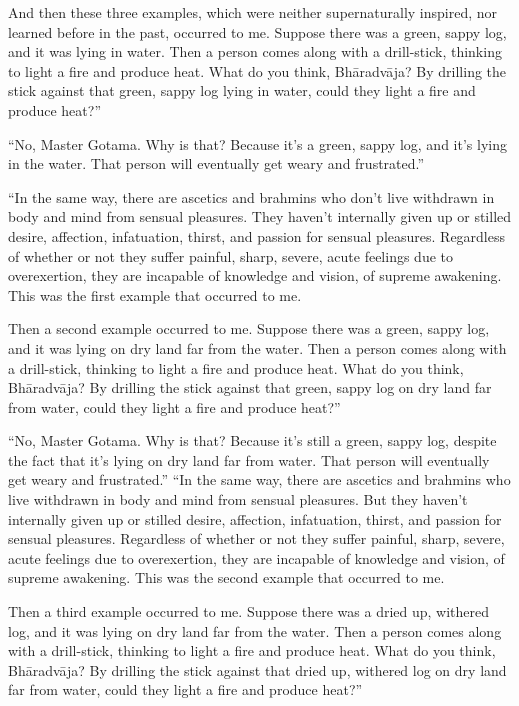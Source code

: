 \documentclass[12pt,openany]{book}%
\begin{document}
And then these three examples, which were neither supernaturally inspired, nor learned before in the past, occurred to me. Suppose there was a green, sappy log, and it was lying in water. Then a person comes along with a drill-stick, thinking to light a fire and produce heat. What do you think, \textsanskrit{Bhāradvāja}? By drilling the stick against that green, sappy log lying in water, could they light a fire and produce heat?” 

“No, Master Gotama. Why is that? Because it’s a green, sappy log, and it’s lying in the water. That person will eventually get weary and frustrated.” 

“In the same way, there are ascetics and brahmins who don’t live withdrawn in body and mind from sensual pleasures. They haven’t internally given up or stilled desire, affection, infatuation, thirst, and passion for sensual pleasures. Regardless of whether or not they suffer painful, sharp, severe, acute feelings due to overexertion, they are incapable of knowledge and vision, of supreme awakening. This was the first example that occurred to me. 

Then a second example occurred to me. Suppose there was a green, sappy log, and it was lying on dry land far from the water. Then a person comes along with a drill-stick, thinking to light a fire and produce heat. What do you think, \textsanskrit{Bhāradvāja}? By drilling the stick against that green, sappy log on dry land far from water, could they light a fire and produce heat?” 

“No, Master Gotama. Why is that? Because it’s still a green, sappy log, despite the fact that it’s lying on dry land far from water. That person will eventually get weary and frustrated.” “In the same way, there are ascetics and brahmins who live withdrawn in body and mind from sensual pleasures. But they haven’t internally given up or stilled desire, affection, infatuation, thirst, and passion for sensual pleasures. Regardless of whether or not they suffer painful, sharp, severe, acute feelings due to overexertion, they are incapable of knowledge and vision, of supreme awakening. This was the second example that occurred to me. 

Then a third example occurred to me. Suppose there was a dried up, withered log, and it was lying on dry land far from the water. Then a person comes along with a drill-stick, thinking to light a fire and produce heat. What do you think, \textsanskrit{Bhāradvāja}? By drilling the stick against that dried up, withered log on dry land far from water, could they light a fire and produce heat?” 
\end{document}
